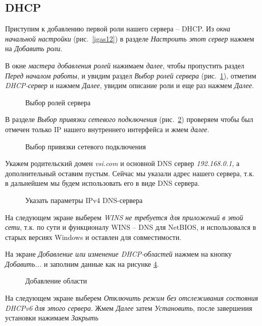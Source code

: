 \subsection{DHCP}
Приступим к добавлению первой роли нашего сервера -- DHCP. Из \textit{окна начальной настройки} (рис.~\ref{igas12}) в разделе \textit{Настроить этот сервер} нажмем на \textit{Добавить роли}.
\par
В окне \textit{мастера добавления ролей} нажимаем \textit{далее}, чтобы пропустить раздел \textit{Перед началом работы}, и увидим раздел \textit{Выбор ролей сервера} (рис.~\ref{igas16}), отметим \textit{DHCP-сервер} и нажмем \textit{Далее}, увидим описание роли и еще раз нажмем \textit{Далее}.
\begin{figure}[H]
\caption{Выбор ролей сервера}
\label{igas16}
\end{figure}
В разделе \textit{Выбор привязки сетевого подключения} (рис.~\ref{igas18}) проверяем чтобы был отмечен только IP нашего внутреннего интерфейса и жмем \textit{далее}.
\begin{figure}[H]
\caption{Выбор привязки сетевого подключения}
\label{igas18}
\end{figure}
Укажем родительский домен \textit{vsi.com} и основной DNS сервер \textit{192.168.0.1}, а дополнительный оставим пустым. Сейчас мы указали адрес нашего сервера, т.к. в дальнейшем мы будем использовать его в виде DNS сервера.
\begin{figure}[H]
\caption{Указать параметры IPv4 DNS-сервера}
\label{igas19}
\end{figure}
На следующем экране выберем \textit{WINS не требуется для приложений в этой сети}, т.к. по сути и функционалу WINS -- DNS для NetBIOS, и использовался в старых версиях Windows и оставлен для совместимости.
\par
На экране \textit{Добавление или изменение DHCP-областей} нажмем на кнопку \textit{Добавить...} и заполним данные как на рисунке \ref{igas22}.
\begin{figure}[H]
\caption{Добавление области}
\label{igas22}
\end{figure}
На следующем экране выберем \textit{Отключить режим без отслеживания состояния DHCPv6 для этого сервера}. Жмем \textit{Далее} затем \textit{Установить}, после завершения установки нажимаем \textit{Закрыть}
\par
